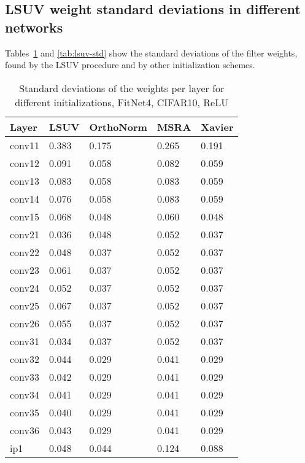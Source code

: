 \documentclass{article} \clearpage{}\usepackage{iclr2016_conference,times}
\begin{document}
\subsection{LSUV weight standard deviations in different networks}
Tables~\ref{tab:relu-std} and \ref{tab:lsuv-std} show the standard deviations of the filter weights, found by the LSUV procedure and by other initialization schemes. 
\begin{table}[htb]
\caption{Standard deviations of the weights per layer for different initializations, FitNet4, CIFAR10, ReLU}
\label{tab:relu-std}
\centering
\begin{tabular}{lllll}
\hline
Layer & LSUV & OrthoNorm & MSRA & Xavier\\
\hline
conv11 & 0.383 & 0.175 & 0.265  & 0.191 \\
conv12 & 0.091 & 0.058 & 0.082   & 0.059\\
conv13 & 0.083 & 0.058 & 0.083 & 0.059\\
conv14 & 0.076  & 0.058 & 0.083  & 0.059\\
conv15 & 0.068  & 0.048 & 0.060  & 0.048\\
\hline
conv21 & 0.036  & 0.048 & 0.052  & 0.037\\
conv22 & 0.048  & 0.037 & 0.052  & 0.037\\
conv23 & 0.061  & 0.037& 0.052  & 0.037\\
conv24 & 0.052  & 0.037& 0.052 & 0.037\\
conv25 & 0.067 & 0.037& 0.052  & 0.037\\
conv26 & 0.055 & 0.037& 0.052  & 0.037\\
\hline
conv31 & 0.034  &0.037& 0.052  & 0.037\\
conv32 & 0.044  &0.029& 0.041& 0.029\\
conv33 & 0.042  &0.029& 0.041 & 0.029\\
conv34 & 0.041 &0.029& 0.041  & 0.029\\
conv35 & 0.040  &0.029& 0.041 & 0.029\\
conv36 & 0.043 &0.029& 0.041 & 0.029\\
\hline
ip1 & 0.048 & 0.044 & 0.124  &  0.088\\
\hline
\end{tabular}
\end{table}
\end{document}
